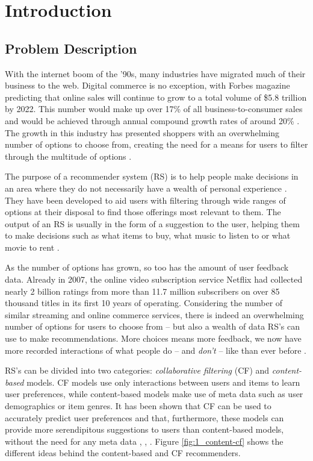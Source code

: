 \chapter{Introduction}

\label{intro} %

\section{Problem Description}
With the internet boom of the '90s, many industries have migrated much of their business to the web. Digital commerce is no exception, with Forbes magazine predicting that online sales will continue to grow to a total volume of \$5.8 trillion by 2022. This number would make up over 17\% of all business-to-consumer sales and would be achieved through annual compound growth rates of around 20\% \parencite{forbes2018growth}. The growth in this industry has presented shoppers with an overwhelming number of options to choose from, creating the need for a means for users to filter through the multitude of options \parencite{handbook_1.1_intro}.

The purpose of a recommender system (RS) is to help people make decisions in an area where they do not necessarily have a wealth of personal experience \parencite{rs_1.1_Resnick}. They have been developed to aid users with filtering through wide ranges of options at their disposal to find those offerings most relevant to them. The output of an RS is usually in the form of a suggestion to the user, helping them to make decisions such as what items to buy, what music to listen to or what movie to rent \parencite{handbook_1.1_intro}.

As the number of options has grown, so too has the amount of user feedback data. Already in 2007, the online video subscription service Netflix had collected nearly 2 billion ratings from more than 11.7 million subscribers on over 85 thousand titles in its first 10 years of operating. Considering the number of similar streaming and online commerce services, there is indeed an overwhelming number of options for users to choose from -- but also a wealth of data RS's can use to make recommendations.
More choices means more feedback, we now have more recorded interactions of what people do -- and \textit{don't} -- like than ever before \parencite{netflix_description}.

RS's can be divided into two categories: \textit{collaborative filtering} (CF) and \textit{content-based} models. CF models use only interactions between users and items to learn user preferences, while content-based models make use of meta data such as user demographics or item genres. It has been shown that CF can be used to accurately predict user preferences and that, furthermore, these models can provide more serendipitous suggestions to users than content-based models, without the need for any meta data \parencite{handbook_1.5_cf}, \parencite{handbook_1.3_content-based}, \parencite{handbook_1.8_evaluation}. Figure \ref{fig:1_content-cf} shows the different ideas behind the content-based and CF recommenders.

